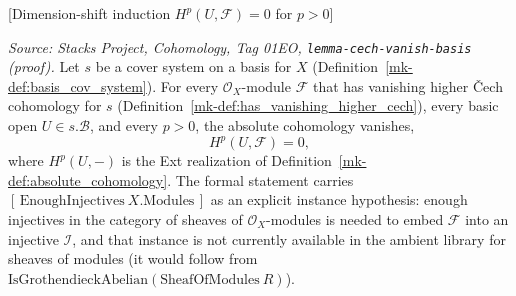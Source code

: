 \begin{lemma}

[Dimension-shift induction \(H^p(U, \mathcal{F}) = 0\) for \(p > 0\)]
  \label{mk-lem:absolute_cohomology_pos_vanishing}

  \textit{Source: Stacks Project, Cohomology, Tag 01EO,
  \texttt{lemma-cech-vanish-basis} (proof).}
  Let \(s\) be a cover system on a basis for \(X\) (Definition~\ref{mk-def:basis_cov_system}). For every
  \(\mathcal{O}_X\)-module \(\mathcal{F}\) that has vanishing higher {\v C}ech cohomology for \(s\)
  (Definition~\ref{mk-def:has_vanishing_higher_cech}), every basic open \(U \in s.\mathcal{B}\), and
  every \(p > 0\), the absolute cohomology vanishes,
  \[
    H^p(U, \mathcal{F}) = 0,
  \]
  where \(H^p(U, -)\) is the Ext realization of Definition~\ref{mk-def:absolute_cohomology}. The
  formal statement carries \([\,\mathrm{EnoughInjectives}\ X.\mathrm{Modules}\,]\) as an explicit
  instance hypothesis: enough injectives in the category of sheaves of
  \(\mathcal{O}_X\)-modules is needed to embed \(\mathcal{F}\) into an injective \(\mathcal{I}\), and
  that instance is not currently available in the ambient library for sheaves of modules (it would
  follow from \(\mathrm{IsGrothendieckAbelian}(\mathrm{SheafOfModules}\ R)\)).
\end{lemma}

